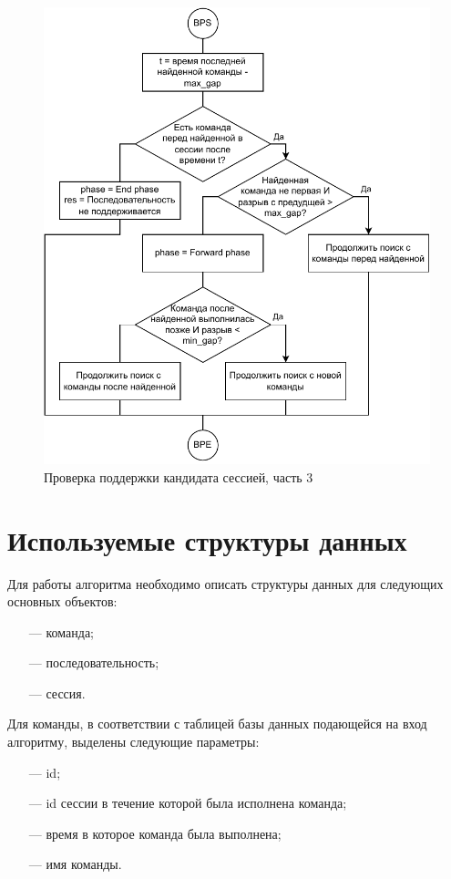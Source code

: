 \newpage
\begin{figure}[h!]
	\centering
	\includegraphics[width=1\textwidth]{inc/img/backward_phase.drawio.pdf}
	\caption{Проверка поддержки кандидата сессией, часть 3}
	\label{backward_phase}
\end{figure}

\newpage
\section{Используемые структуры данных}
Для работы алгоритма необходимо описать структуры данных для следующих основных объектов:
\begin{enumerate}
	\item[---] команда;
	\item[---] последовательность;
	\item[---] сессия.
\end{enumerate}

Для команды, в соответствии с таблицей базы данных подающейся на вход алгоритму, выделены следующие параметры:
\begin{itemize}
	\item[---] id;
	\item[---] id сессии в течение которой была исполнена команда;
	\item[---] время в которое команда была выполнена;
	\item[---] имя команды.
\end{itemize}

